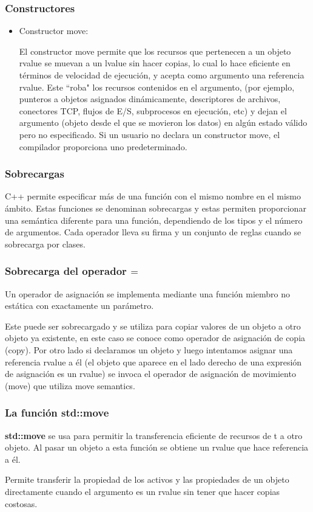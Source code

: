 \documentclass{beamer}
\begin{document}
	\begin{frame}
		\frametitle{Constructores}
		\begin{itemize}
			\item Constructor move:
			
			El constructor move permite que los recursos que pertenecen a un objeto rvalue se muevan a un lvalue sin hacer copias, lo cual lo hace eficiente en términos de velocidad de ejecución, y acepta como argumento una referencia rvalue. Este ``roba" los recursos contenidos en el argumento, (por ejemplo, punteros a objetos asignados dinámicamente, descriptores de archivos, conectores TCP, flujos de E/S, subprocesos en ejecución, etc) y dejan el argumento (objeto desde el que se movieron los datos) en algún estado válido pero no especificado. Si un usuario no declara un constructor move, el compilador proporciona uno predeterminado.	
		\end{itemize}
	\end{frame}

	\begin{frame}
		\frametitle{Sobrecargas}
		C++ permite especificar más de una función con el mismo nombre en el mismo ámbito. Estas funciones se denominan sobrecargas y estas permiten proporcionar una semántica diferente para una función, dependiendo de los tipos y el número de argumentos. Cada operador lleva su firma y un conjunto de reglas cuando se sobrecarga por clases.
	\end{frame}
	
	\begin{frame}
		\frametitle{Sobrecarga del operador $ \textbf{=} $}
		Un operador de asignación se implementa mediante una función miembro no estática con exactamente un parámetro.
		
		Este puede ser sobrecargado y se utiliza para copiar valores de un objeto a otro objeto ya existente, en este caso se conoce como operador de asignaci\'on de copia (copy). Por otro lado si declaramos un objeto y luego intentamos asignar una referencia rvalue a él (el objeto que aparece en el lado derecho de una expresión de asignación es un rvalue) se invoca el operador de asignación de movimiento (move) que utiliza move semantics. 
	\end{frame}

	\begin{frame}
		\frametitle{La funci\'on std::move}
		\textbf{std::move} se usa para permitir la transferencia eficiente de recursos de t a otro objeto. Al pasar un objeto a esta función se obtiene un rvalue que hace referencia a él. 
		
		Permite transferir la propiedad de los activos y las propiedades de un objeto directamente cuando el argumento es un rvalue sin tener que hacer copias costosas.
	\end{frame}
\end{document}

